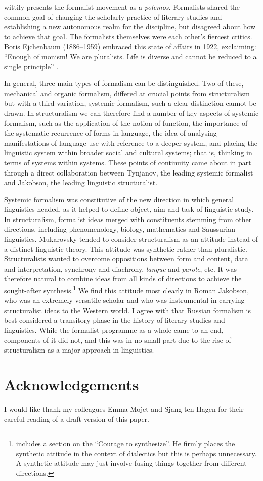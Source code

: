 \documentclass[output=paper]{langscibook}
\begin{document}
\citet{Steiner1984} wittily presents the formalist movement as a \emph{polemos}. Formalists shared the common goal of changing the scholarly practice of literary studies and establishing a new autonomous realm for the discipline, but disagreed about how to achieve that goal. The formalists themselves were each other's fiercest critics. Boris Ejchenbaum (1886--1959) embraced this state of affairs in 1922, exclaiming: ``Enough of monism! We are pluralists. Life is diverse and cannot be reduced to a single principle'' \citep[quoted in English in][259]{Steiner1984}.

In general, three main types of formalism can be distinguished. Two of these, mechanical and organic formalism, differed at crucial points from structuralism but with a third variation, systemic formalism, such a clear distinction cannot be drawn. In structuralism we can therefore find a number of key aspects of systemic formalism, such as the application of the notion of function, the importance of the systematic recurrence of forms in language, the idea of analysing manifestations of language use with reference to a deeper system, and placing the linguistic system within broader social and cultural systems; that is, thinking in terms of systems within systems. These points of continuity came about in part through a direct collaboration between Tynjanov, the leading systemic formalist and Jakobson, the leading linguistic structuralist.

Systemic formalism was constitutive of the new direction in which general linguistics headed, as it helped to define object, aim and task of linguistic study. In structuralism, formalist ideas merged with constituents stemming from other directions, including phenomenology, biology, mathematics and Saussurian linguistics. Mukarovsky tended to consider structuralism as an attitude instead of a distinct linguistic theory. This attitude was synthetic rather than pluralistic. Structuralists wanted to overcome oppositions between form and content, data and interpretation, synchrony and diachrony, \emph{langue} and \emph{parole}, etc. It was therefore natural to combine ideas from all kinds of directions to achieve the sought-after synthesis.\footnote{\citet[150--152]{Toman1995} includes a section on the ``Courage to synthesize''. He firmly places the synthetic attitude in the context of dialectics but this is perhaps unnecessary. A synthetic attitude may just involve fusing things together from different directions.} We find this attitude most clearly in Roman Jakobson, who was an extremely versatile scholar and who was instrumental in carrying structuralist ideas to the Western world. I agree with \citet{Steiner1984} that Russian formalism is best considered a transitory phase in the history of literary studies and linguistics. While the formalist programme as a whole came to an end, components of it did not, and this was in no small part due to the rise of structuralism as a major approach in linguistics. 

\section*{Acknowledgements}

I would like thank my colleagues Emma Mojet and Sjang ten Hagen for their careful reading of a draft version of this paper.

\sloppy
\printbibliography[heading=subbibliography,notkeyword=this] 
\end{document}
